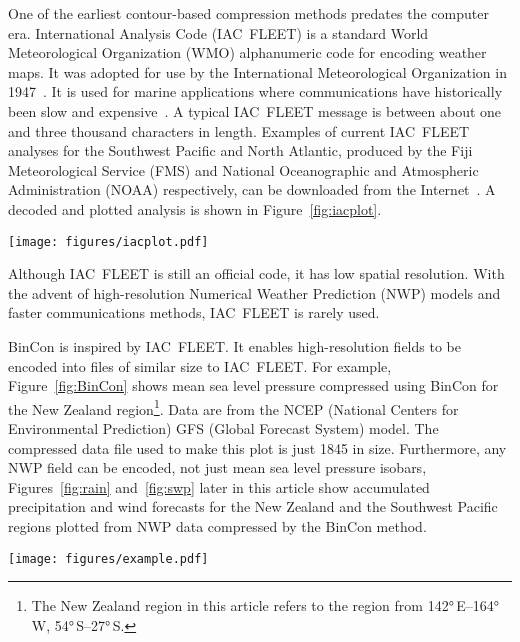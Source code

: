 \documentclass[12pt,a4paper]{article}
\begin{document}
One of the earliest contour-based compression methods predates the
computer era. International Analysis Code (IAC~FLEET) is a standard
World Meteorological Organization (WMO) alphanumeric code for encoding
weather maps. It was adopted for use by the International Meteorological
Organization in 1947~\citep[Resolution 156, p.~161]{imo1947}. It is used for
marine applications where communications have historically been slow and
expensive~\citep[pp.~87--90]{wmo2019a}. A typical IAC~FLEET message is
between about one and three thousand characters in length. Examples of current
IAC~FLEET analyses for the Southwest Pacific and North Atlantic,
produced by the Fiji Meteorological Service (FMS) and National
Oceanographic and Atmospheric Administration (NOAA) respectively, can
be downloaded from the Internet~\citep{fms2023, noaa2023}. A decoded and
plotted analysis is shown in Figure~\ref{fig:iacplot}.

\begin{figure*}
\centering
\texttt{[image: figures/iacplot.pdf]}
\caption{\label{fig:iacplot}Isobars plotted from Fleet Code using
OpenCPN~\citep{opencpn2023} The yellow lines are easterly wind troughs, and the
orange line is a frontal system.}
\end{figure*}

Although IAC~FLEET is still an official code, it has low spatial resolution.
With the advent of high-resolution Numerical Weather Prediction (NWP) models
and faster communications methods, IAC~FLEET is rarely used.

BinCon is inspired by IAC~FLEET. It enables high-resolution fields to be
encoded into files of similar size to IAC~FLEET. For example,
Figure~\ref{fig:BinCon} shows mean sea level pressure compressed using BinCon
for the New Zealand region\footnote{The New Zealand region in this article
refers to the region from \ang{142}\,E--\ang{164}\,W,
\ang{54}\,S--\ang{27}\,S.}. Data are from the NCEP (National Centers for
Environmental Prediction) GFS (Global Forecast System) model. The compressed
data file used to make this plot is just \SI{1845}{\byte} in size. Furthermore,
any NWP field can be encoded, not just mean sea level pressure isobars,
Figures~\ref{fig:rain} and~\ref{fig:swp} later in this article show accumulated
precipitation and wind forecasts for the New Zealand and the Southwest Pacific
regions plotted from NWP data compressed by the BinCon method.

\begin{figure*}
\centering
\texttt{[image: figures/example.pdf]}
\caption{\label{fig:BinCon}Mean sea level pressure forecast valid at
1200\,UTC, 5 January 2023. Data are compressed using the BinCon
method.}
\end{figure*}
\end{document}
